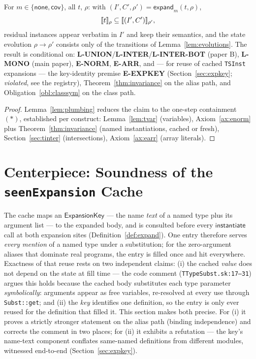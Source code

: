 \documentclass[11pt]{article}
\newcommand{\expandop}{\mathsf{expand}}
\newcommand{\instop}{\mathsf{instantiate}}
\newcommand{\Cov}{\mathsf{cov}}
\newcommand{\NoneM}{\mathsf{none}}
\begin{document}
\begin{theorem}[T-EXP]
\label{thm:texp}
For $m \in \{\NoneM, \Cov\}$, all $t$, $\rho$: with
$(I', C', \rho') = \expandop_m(t, \rho)$,
\[
\llbracket t \rrbracket_\rho \subseteq \llbracket (I', C') \rrbracket_{\rho'},
\]
residual instances appear verbatim in $I'$ and keep their semantics,
and the state evolution $\rho \to \rho'$ consists only of the
transitions of Lemma~\ref{lem:evolutions}. The result is conditional on:
\textbf{L-UNION}/\textbf{L-INTER}/\textbf{L-INTER-BOT} (paper B), \textbf{L-MONO} (main
paper), \textbf{E-NORM}, \textbf{E-ARR}, and — for reuse of cached
\texttt{TSInst} expansions — the key-identity premise \textbf{E-EXPKEY}
(Section~\ref{sec:expkey}; \emph{violated}, see the registry),
Theorem~\ref{thm:invariance} on the alias path, and
Obligation~\ref{obl:classsym} on the class path.
\end{theorem}
\begin{proof}
Lemma~\ref{lem:plumbing} reduces the claim to the one-step containment
$(\ast)$, established per construct: Lemma~\ref{lem:tvar} (variables),
Axiom~\ref{ax:enorm} plus Theorem~\ref{thm:invariance} (named
instantiations, cached or fresh), Section~\ref{sec:tinter}
(intersections), Axiom~\ref{ax:earr} (array literals).
\end{proof}

\section{Centerpiece: Soundness of the \texttt{seenExpansion} Cache}
\label{sec:cache}

The cache maps an $\mathsf{ExpansionKey}$ — the name \emph{text} of a
named type plus its argument list — to the expanded body, and is
consulted before every $\instop$ call at both expansion sites
(Definition~\ref{def:expand}). One entry therefore serves \emph{every
mention} of a named type under a substitution; for the zero-argument
aliases that dominate real programs, the entry is filled once and hit
everywhere. Exactness of that reuse rests on two independent claims:
(i) the cached \emph{value} does not depend on the state at fill time —
the code comment (\texttt{TTypeSubst.sk:17--31}) argues this holds
because the cached body substitutes each type parameter
\emph{symbolically}: arguments appear as free variables, re-resolved at
every use through \texttt{Subst::get}; and (ii) the \emph{key}
identifies one definition, so the entry is only ever reused for the
definition that filled it. This section makes both precise. For (i) it
proves a strictly stronger statement on the alias path
(binding independence) and corrects the comment in two places; for (ii) it
exhibits a refutation — the key's name-text component conflates
same-named definitions from different modules, witnessed end-to-end
(Section~\ref{sec:expkey}).
\end{document}
